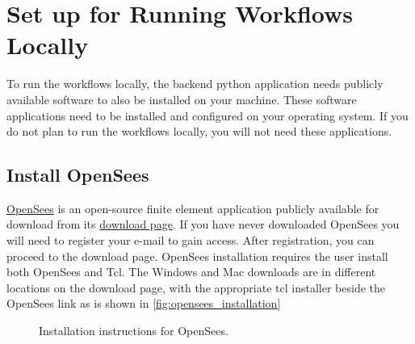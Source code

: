 \section{Set up for Running Workflows Locally}\label{setup}

To run the workflows locally, the backend python application needs
publicly available software to also be installed on your
machine. These software applications need to be installed and
configured on your operating system. If you do not plan to run the
workflows locally, you will not need these applications.

\subsection{Install OpenSees}

\href{https://opensees.berkeley.edu}{OpenSees} is an open-source finite element application publicly available for download from its \href{https://opensees.berkeley.edu/OpenSees/user/download.php}{download page}. If you have never downloaded OpenSees you will need to register your e-mail to gain access. After registration, you can proceed to the download page. OpenSees installation requires the user install both OpenSees and Tcl. The Windows and Mac downloads are in different locations on the download page, with the appropriate tcl installer beside the OpenSees link as is shown in \autoref{fig:opensees_installation}

\begin{figure}[!htbp]
   \caption{Installation
    instructions for OpenSees.}  \label{fig:opensees_installation}
\end{figure}

